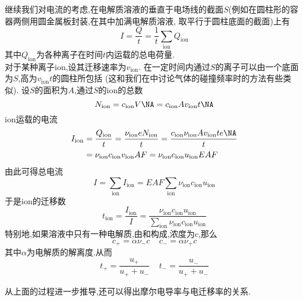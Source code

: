 \documentclass{ctexart}
\begin{document}
\begin{derivation}
    继续我们对电流的考虑,在电解质溶液的垂直于电场线的截面$S$(例如在圆柱形的容器两侧用圆金属板封装,在其中加满电解质溶液,%
    取平行于圆柱底面的截面)上有
    \[I=\dfrac{Q}{t}=\dfrac{1}{t}\sum_{\text{ion}}Q_\text{ion}\]
    其中$Q_\text{ion}$为各种离子在时间$t$内运载的总电荷量.\\
    对于某种离子ion,设其迁移速率为$v_{\text{ion}}$.%
    在一定时间内通过$S$的离子可以由一个底面为$S$,高为$v_{\text{ion}}t$的圆柱所包括%
    (这和我们在中讨论气体的碰撞频率时的方法有些类似).%
    设$S$的面积为$A$,通过$S$的ion的总数
    \[N_{\text{ion}}=c_{\text{ion}}V\NA=c_{\text{ion}}Av_{\text{ion}}t\NA\]
    ion运载的电流\footnotemark
    \[\begin{aligned}
        I_{\text{ion}}
        &= \dfrac{Q_{\text{ion}}}{t}=\dfrac{\nu_{\text{ion}}eN_{\text{ion}}}{t} = \dfrac{c_{\text{ion}}\nu_{\text{ion}}Av_{\text{ion}}te\NA}{t} \\
        &= \nu_{\text{ion}}c_{\text{ion}}v_{\text{ion}}AF=\nu_{\text{ion}}c_{\text{ion}}u_{\text{ion}}EAF
    \end{aligned}\]
    由此可得总电流
    \[I=\sum_{\text{ion}}I_{\text{ion}}=EAF\sum_{\text{ion}}\nu_{\text{ion}}c_{\text{ion}}u_{\text{ion}}\]
    于是ion的迁移数
    \[t_{\text{ion}}=\dfrac{I_{\text{ion}}}{I}=\dfrac{\nu_{\text{ion}}c_{\text{ion}}u_{\text{ion}}}{\displaystyle\sum_{\text{ion}}\nu_{\text{ion}}c_{\text{ion}}u_{\text{ion}}}\]
    特别地,如果溶液中只有一种电解质,由和构成,浓度为$c$,那么
    \[c_+=\alpha\nu_-c\ \ \ \ \ c_-=\alpha\nu_+c\]
    其中$\alpha$为电解质的解离度.从而
    \[t_+=\dfrac{u_+}{u_++u_-}\ \ \ \ \ t_-=\dfrac{u_-}{u_++u_-}\]
    
\end{derivation}
从上面的过程进一步推导,还可以得出摩尔电导率与电迁移率的关系.
\end{document}
